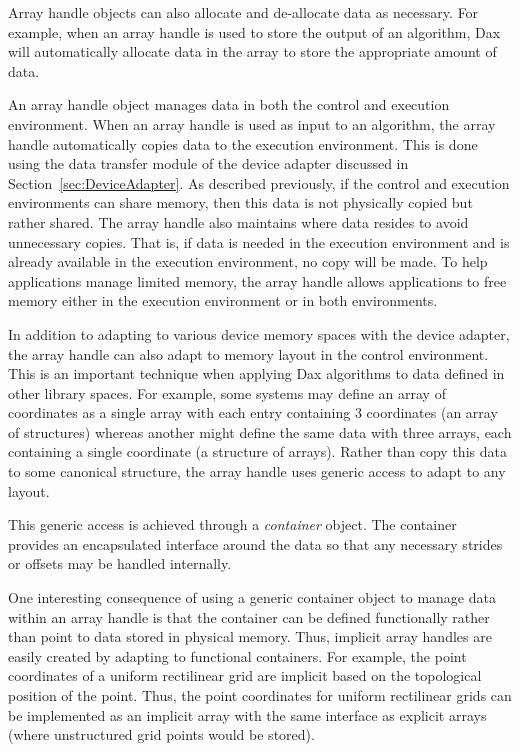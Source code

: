 \documentclass[conference]{IEEEtran}
\newcommand*{\keyterm}[1]{\emph{#1}}
\begin{document}
Array handle objects can also allocate and de-allocate data as necessary.
For example, when an array handle is used to store the output of an
algorithm, Dax will automatically allocate data in the array to store the
appropriate amount of data.

An array handle object manages data in both the control and execution
environment.  When an array handle is used as input to an algorithm, the
array handle automatically copies data to the execution environment.  This
is done using the data transfer module of the device adapter discussed in
Section~\ref{sec:DeviceAdapter}.  As described previously, if the control
and execution environments can share memory, then this data is not physically
copied but rather shared.  The array handle also maintains where data
resides to avoid unnecessary copies.  That is, if data is needed in the
execution environment and is already available in the execution environment,
no copy will be made.  To help applications manage limited memory, the
array handle allows applications to free memory either in the execution
environment or in both environments.

In addition to adapting to various device memory spaces with the device
adapter, the array handle can also adapt to memory layout in the control
environment.  This is an important technique when applying Dax algorithms
to data defined in other library spaces.  For example, some systems may
define an array of coordinates as a single array with each entry containing
3 coordinates (an array of structures) whereas another might define the
same data with three arrays, each containing a single coordinate (a
structure of arrays).  Rather than copy this data to some canonical
structure, the array handle uses generic access to adapt to any layout.

This generic access is achieved through a \keyterm{container} object.  The
container provides an encapsulated interface around the data so that any
necessary strides or offsets may be handled internally.

One interesting consequence of using a generic container object to manage
data within an array handle is that the container can be defined
functionally rather than point to data stored in physical memory.  Thus,
implicit array handles are easily created by adapting to functional
containers.  For example, the point coordinates of a uniform rectilinear
grid are implicit based on the topological position of the point.  Thus,
the point coordinates for uniform rectilinear grids can be implemented as
an implicit array with the same interface as explicit arrays (where
unstructured grid points would be stored).
\end{document}

